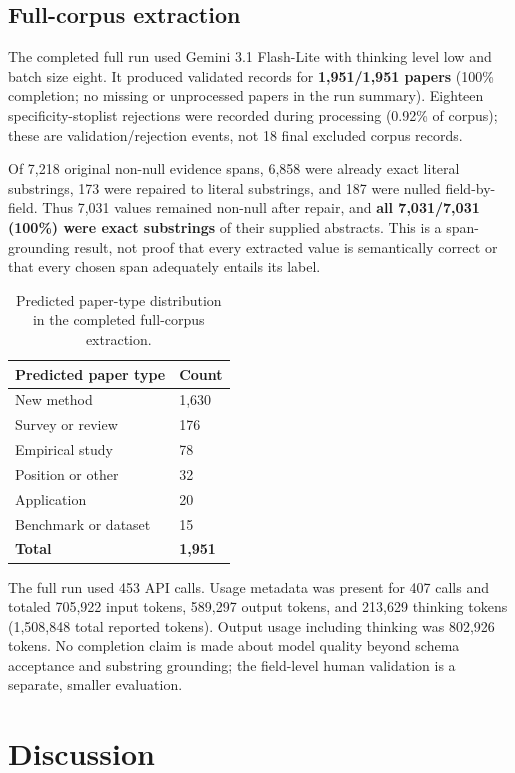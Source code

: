 \documentclass[sigconf,review,anonymous]{acmart}
\begin{document}
\subsection{Full-corpus extraction}
The completed full run used Gemini 3.1 Flash-Lite with thinking level low and batch size eight. It produced validated records for \textbf{1,951/1,951 papers} (100\% completion; no missing or unprocessed papers in the run summary). Eighteen specificity-stoplist rejections were recorded during processing (0.92\% of corpus); these are validation/rejection events, not 18 final excluded corpus records.

Of 7,218 original non-null evidence spans, 6,858 were already exact literal substrings, 173 were repaired to literal substrings, and 187 were nulled field-by-field. Thus 7,031 values remained non-null after repair, and \textbf{all 7,031/7,031 (100\%) were exact substrings} of their supplied abstracts. This is a span-grounding result, not proof that every extracted value is semantically correct or that every chosen span adequately entails its label.

\begin{table}[t]
\centering
\small
\setlength{\tabcolsep}{3pt}
\begin{tabularx}{\columnwidth}{>{\raggedright\arraybackslash}XY}
\toprule
Predicted paper type & Count \\
\midrule
New method & 1,630 \\
Survey or review & 176 \\
Empirical study & 78 \\
Position or other & 32 \\
Application & 20 \\
Benchmark or dataset & 15 \\
\textbf{Total} & \textbf{1,951} \\
\bottomrule
\end{tabularx}
\caption{Predicted paper-type distribution in the completed full-corpus extraction.}
\end{table}

The full run used 453 API calls. Usage metadata was present for 407 calls and totaled 705,922 input tokens, 589,297 output tokens, and 213,629 thinking tokens (1,508,848 total reported tokens). Output usage including thinking was 802,926 tokens. No completion claim is made about model quality beyond schema acceptance and substring grounding; the field-level human validation is a separate, smaller evaluation.

\section{Discussion}
\end{document}
